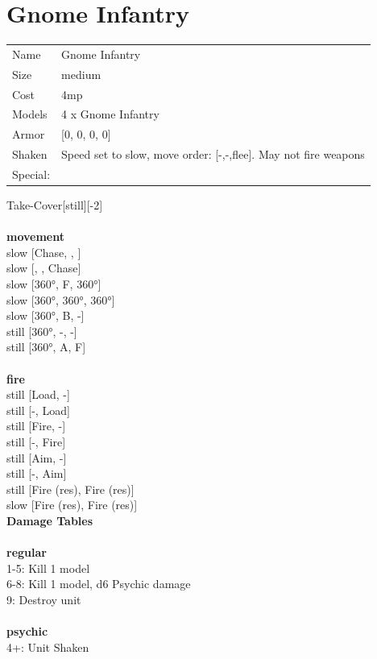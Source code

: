 \clearpage

\section{ Gnome Infantry }

\begin{tabular}{ll}
  Name & Gnome Infantry \\
  Size & medium\\
  Cost & 4mp\\
  Models & 4 x Gnome Infantry\\
  Armor & [0, 0, 0, 0]\\
  Shaken & Speed set to slow, move order: [-,-,flee]. May not fire weapons\\
  Special: \\
\end{tabular}

\noindent Take-Cover[still][-2]\\ 


\ \\ {\bf movement } \\
slow [Chase, , ] \\
slow [, , Chase] \\
slow [360°, F, 360°] \\
slow [360°, 360°, 360°] \\
slow [360°, B, -] \\
still [360°, -, -] \\
still [360°, A, F] \\
\ \\ {\bf fire } \\
still [Load, -] \\
still [-, Load] \\
still [Fire, -] \\
still [-, Fire] \\
still [Aim, -] \\
still [-, Aim] \\
still [Fire (res), Fire (res)] \\
slow [Fire (res), Fire (res)] \\


{\bf Damage Tables} \\
\ \\ {\bf regular } \\
1-5: Kill 1 model \\
6-8: Kill 1 model, d6 Psychic damage \\
9: Destroy unit \\
\ \\ {\bf psychic } \\
4+: Unit Shaken \\


